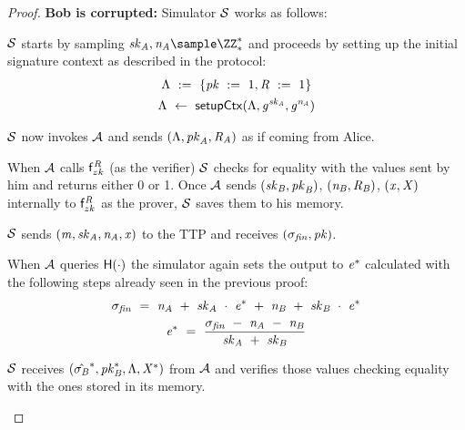 \begin{proof}
    \textbf{Bob is corrupted: } Simulator $\mathcal{S}$ works as follows:
    \begin{asparaenum}
        \item $\mathcal{S}$ starts by sampling $\varSecKeyAlice, \varNonceAlice \sample \cnstIntegersPrimeWithoutZero{*}$ and proceeds by setting up the initial signature context as described in the protocol:
        \begin{gather*}
            \Lambda ~:=~ \{ \mathit{pk} ~:=~ 1, \mathit{R} ~:=~ 1 \} \\
            \Lambda ~\leftarrow~ \mathsf{setupCtx}( \Lambda, \mathit{g}^{\mathit{sk}_{\mathit{A}}}, \mathit{g}^{\mathit{\mathit{n}_{\mathit{A}}}} ) \\
        \end{gather*}
        \item $\mathcal{S}$ now invokes $\mathcal{A}$ and sends $(\Lambda, \mathit{pk}_{\mathit{A}}, \mathit{R}_{\mathit{A}})$ as if coming from Alice.
        \item When $\mathcal{A}$ calls $\mathsf{f}^{\mathit{R}}_{zk}$ (as the verifier) $\mathcal{S}$ checks for equality with the values sent by him and returns either 0 or 1.
        Once $\mathcal{A}$ sends $(\mathit{sk}_{\mathit{B}}, \mathit{pk}_{\mathit{B}})$, $(\mathit{\mathit{n}_{\mathit{B}}}, \mathit{R}_{\mathit{B}})$, $(\mathit{x}, \mathit{X})$ internally to $\mathsf{f}^{\mathit{R}}_{zk}$ as the prover, $\mathcal{S}$ saves them to his memory.
        \item $\mathcal{S}$ sends $(\mathit{m}, \mathit{sk}_{\mathit{A}}, \mathit{\mathit{n}_{\mathit{A}}}, \mathit{x})$ to the TTP and receives $(\sigma_{\mathit{fin}}, \mathit{pk})$.
        \item When $\mathcal{A}$ queries $\mathsf{H} (\cdot)$ the simulator again sets the output to $\mathit{e}^*$ calculated with the following steps already seen in the previous proof:
        \begin{gather*}
            \sigma_{\mathit{fin}} ~=~ \mathit{\mathit{n}_{\mathit{A}}} ~+~ \mathit{sk}_{\mathit{A}} ~\cdot~ \mathit{e}^* ~+~ \mathit{\mathit{n}_{\mathit{B}}} ~+~ \mathit{sk}_{\mathit{B}} ~\cdot~ \mathit{e}^* \\
            \mathit{e}^* ~=~ \frac{\sigma_{\mathit{fin}} ~-~ \mathit{\mathit{n}_{\mathit{A}}} ~-~ \mathit{\mathit{n}_{\mathit{B}}}}{\mathit{sk}_{\mathit{A}} ~+~ \mathit{sk}_{\mathit{B}}}
        \end{gather*}
        \item $\mathcal{S}$ receives $(\hat{\sigma_{\mathit{B}}}^*, \mathit{pk}_{\mathit{B}}^*, \Lambda, \mathit{X}^*)$ from $\mathcal{A}$ and verifies those values checking equality with the ones stored in its memory.

\end{asparaenum}
\end{proof}
